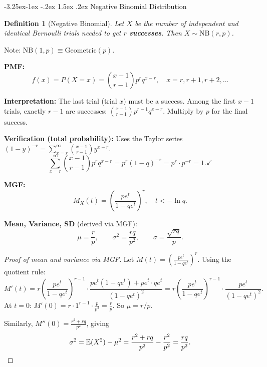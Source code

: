 \documentclass{article}
\makeatletter
\newtheorem{definition}[theorem]{Definition}
\theoremstyle{remark}
\newlength{\subsecindent}
\renewcommand\subsection{\@startsection{subsection}{2}{\subsecindent}%
  {-3.25ex\@plus -1ex \@minus -.2ex}%
  {1.5ex \@plus .2ex}%
  {\normalfont\large\bfseries}}
\newenvironment{sub}{%
  \begin{list}{}{%
    \setlength{\leftmargin}{4em}%
    \setlength{\rightmargin}{0pt}%
    \setlength{\topsep}{0pt}%
    \setlength{\partopsep}{0pt}%
    \setlength{\parsep}{\parskip}%
    \setlength{\itemsep}{\parskip}%
  }\item\relax
}{\end{list}}
\newcommand{\E}{\mathbb{E}}
\makeatother
\begin{document}
\subsection{Negative Binomial Distribution}
\begin{sub}

\begin{definition}[Negative Binomial]
  Let $X$ be the number of independent and identical Bernoulli trials needed
  to get $r$ \textbf{successes}. Then $X \sim \text{NB}(r, p)$.
\end{definition}

Note: $\text{NB}(1, p) \equiv \text{Geometric}(p)$.

\textbf{PMF:}
\begin{equation}
  f(x) = P(X = x) = \binom{x-1}{r-1} p^r q^{x-r}, \quad x = r, r+1, r+2, \ldots
  \label{eq:nb-pmf}
\end{equation}

\textbf{Interpretation:} The last trial (trial $x$) must be a success. Among the
first $x - 1$ trials, exactly $r - 1$ are successes: $\binom{x-1}{r-1} p^{r-1} q^{x-r}$.
Multiply by $p$ for the final success.

\textbf{Verification (total probability):}
Uses the Taylor series $(1 - y)^{-r} = \sum_{x=r}^{\infty} \binom{x-1}{r-1} y^{x-r}$.
\[
  \sum_{x=r}^{\infty} \binom{x-1}{r-1} p^r q^{x-r} = p^r (1-q)^{-r} = p^r \cdot p^{-r} = 1. \checkmark
\]

\textbf{MGF:}
\begin{equation}
  M_X(t) = \left(\frac{pe^t}{1 - qe^t}\right)^r, \quad t < -\ln q.
  \label{eq:nb-mgf}
\end{equation}

\textbf{Mean, Variance, SD} (derived via MGF):
\begin{equation}
  \mu = \frac{r}{p}, \qquad \sigma^2 = \frac{rq}{p^2}, \qquad \sigma = \frac{\sqrt{rq}}{p}.
  \label{eq:nb-params}
\end{equation}

\begin{proof}[Proof of mean and variance via MGF]
  Let $M(t) = \left(\frac{pe^t}{1 - qe^t}\right)^r$. Using the quotient rule:
  \[
    M'(t) = r\left(\frac{pe^t}{1 - qe^t}\right)^{r-1} \cdot \frac{pe^t(1-qe^t) + pe^t \cdot qe^t}{(1-qe^t)^2}
           = r\left(\frac{pe^t}{1-qe^t}\right)^{r-1} \cdot \frac{pe^t}{(1-qe^t)^2}.
  \]
  At $t = 0$: $M'(0) = r \cdot 1^{r-1} \cdot \frac{p}{p^2} = \frac{r}{p}$. So $\mu = r/p$.

  Similarly, $M''(0) = \frac{r^2 + rq}{p^2}$, giving
  \[
    \sigma^2 = \E(X^2) - \mu^2 = \frac{r^2 + rq}{p^2} - \frac{r^2}{p^2} = \frac{rq}{p^2}. \qedhere
  \]
\end{proof}


\end{sub}
\end{document}
